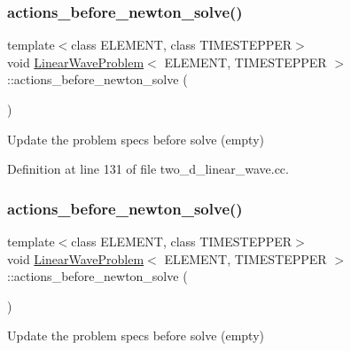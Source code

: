 \subsubsection{\texorpdfstring{actions\+\_\+before\+\_\+newton\+\_\+solve()}{actions\_before\_newton\_solve()}\hspace{0.1cm}{\footnotesize\ttfamily [1/2]}}
{\footnotesize\ttfamily template$<$class E\+L\+E\+M\+E\+NT, class T\+I\+M\+E\+S\+T\+E\+P\+P\+ER$>$ \\
void \hyperlink{classLinearWaveProblem}{Linear\+Wave\+Problem}$<$ E\+L\+E\+M\+E\+NT, T\+I\+M\+E\+S\+T\+E\+P\+P\+ER $>$\+::actions\+\_\+before\+\_\+newton\+\_\+solve (\begin{DoxyParamCaption}{ }\end{DoxyParamCaption})\hspace{0.3cm}{\ttfamily [inline]}}



Update the problem specs before solve (empty) 



Definition at line 131 of file two\+\_\+d\+\_\+linear\+\_\+wave.\+cc.

\mbox{\label{classLinearWaveProblem_a66e87510f6fa8af693cede514cb7a62e}} 
\subsubsection{\texorpdfstring{actions\+\_\+before\+\_\+newton\+\_\+solve()}{actions\_before\_newton\_solve()}\hspace{0.1cm}{\footnotesize\ttfamily [2/2]}}
{\footnotesize\ttfamily template$<$class E\+L\+E\+M\+E\+NT, class T\+I\+M\+E\+S\+T\+E\+P\+P\+ER$>$ \\
void \hyperlink{classLinearWaveProblem}{Linear\+Wave\+Problem}$<$ E\+L\+E\+M\+E\+NT, T\+I\+M\+E\+S\+T\+E\+P\+P\+ER $>$\+::actions\+\_\+before\+\_\+newton\+\_\+solve (\begin{DoxyParamCaption}{ }\end{DoxyParamCaption})\hspace{0.3cm}{\ttfamily [inline]}}



Update the problem specs before solve (empty) 



